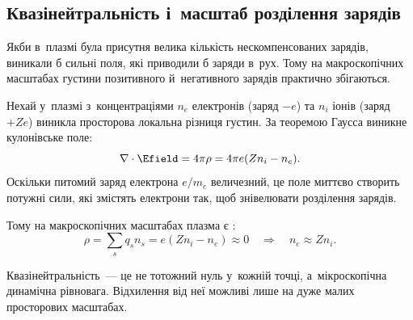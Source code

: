 \subsection*{Квазінейтральність і~масштаб розділення зарядів}



Якби в~плазмі була присутня велика кількість нескомпенсованих зарядів, виникали б сильні
поля, які приводили б заряди в~рух. Тому на макроскопічних масштабах густини позитивного
й~негативного зарядів практично збігаються.


Нехай у~плазмі з~концентраціями $n_e$ електронів (заряд $-e$) та $n_i$ іонів (заряд $+Ze$)
виникла просторова локальна різниця густин. За теоремою Гаусса виникне кулонівське поле:
\begin{equation}
	\nabla \cdot \Efield = 4\pi \rho = 4\pi e (Z n_i - n_e).
\end{equation}
Оскільки питомий заряд електрона $e/m_e$ величезний, це поле миттєво створить потужні
сили, які змістять електрони так, щоб знівелювати розділення зарядів.

Тому на макроскопічних масштабах плазма є :
\begin{equation}\label{eq:quasineutrality}
	\rho = \sum_s q_s n_s = e(Z n_i - n_e) \approx 0 \quad \Rightarrow \quad n_e \approx Z n_i.
\end{equation}
\begin{Attention}
	Квазінейтральність~--- це не тотожний нуль у~кожній точці, а~мікроскопічна динамічна
	рівновага. Відхилення від неї можливі лише на дуже малих просторових масштабах.
\end{Attention}



